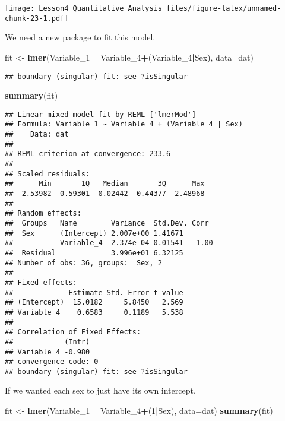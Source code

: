 \documentclass[
]{article}
\newenvironment{Shaded}{\begin{snugshade}}{\end{snugshade}}
\newcommand{\DataTypeTok}[1]{\textcolor[rgb]{0.13,0.29,0.53}{#1}}
\newcommand{\DecValTok}[1]{\textcolor[rgb]{0.00,0.00,0.81}{#1}}
\newcommand{\KeywordTok}[1]{\textcolor[rgb]{0.13,0.29,0.53}{\textbf{#1}}}
\newcommand{\NormalTok}[1]{#1}
\newcommand{\OperatorTok}[1]{\textcolor[rgb]{0.81,0.36,0.00}{\textbf{#1}}}
\newcommand{\StringTok}[1]{\textcolor[rgb]{0.31,0.60,0.02}{#1}}
\begin{document}
\texttt{[image: Lesson4\_Quantitative\_Analysis\_files/figure-latex/unnamed-chunk-23-1.pdf]}

We need a new package to fit this model.

\begin{Shaded}
\begin{Highlighting}[]
\NormalTok{fit <-}\StringTok{ }\KeywordTok{lmer}\NormalTok{(Variable_}\DecValTok{1} \OperatorTok{~}\StringTok{ }\NormalTok{Variable_}\DecValTok{4}\OperatorTok{+}\NormalTok{(Variable_}\DecValTok{4}\OperatorTok{|}\NormalTok{Sex), }\DataTypeTok{data=}\NormalTok{dat)}
\end{Highlighting}
\end{Shaded}

\begin{verbatim}
## boundary (singular) fit: see ?isSingular
\end{verbatim}

\begin{Shaded}
\begin{Highlighting}[]
\KeywordTok{summary}\NormalTok{(fit)}
\end{Highlighting}
\end{Shaded}

\begin{verbatim}
## Linear mixed model fit by REML ['lmerMod']
## Formula: Variable_1 ~ Variable_4 + (Variable_4 | Sex)
##    Data: dat
## 
## REML criterion at convergence: 233.6
## 
## Scaled residuals: 
##      Min       1Q   Median       3Q      Max 
## -2.53982 -0.59301  0.02442  0.44377  2.48968 
## 
## Random effects:
##  Groups   Name        Variance  Std.Dev. Corr 
##  Sex      (Intercept) 2.007e+00 1.41671       
##           Variable_4  2.374e-04 0.01541  -1.00
##  Residual             3.996e+01 6.32125       
## Number of obs: 36, groups:  Sex, 2
## 
## Fixed effects:
##             Estimate Std. Error t value
## (Intercept)  15.0182     5.8450   2.569
## Variable_4    0.6583     0.1189   5.538
## 
## Correlation of Fixed Effects:
##            (Intr)
## Variable_4 -0.980
## convergence code: 0
## boundary (singular) fit: see ?isSingular
\end{verbatim}

If we wanted each sex to just have its own intercept.

\begin{Shaded}
\begin{Highlighting}[]
\NormalTok{fit <-}\StringTok{ }\KeywordTok{lmer}\NormalTok{(Variable_}\DecValTok{1} \OperatorTok{~}\StringTok{ }\NormalTok{Variable_}\DecValTok{4}\OperatorTok{+}\NormalTok{(}\DecValTok{1}\OperatorTok{|}\NormalTok{Sex), }\DataTypeTok{data=}\NormalTok{dat)}
\KeywordTok{summary}\NormalTok{(fit)}
\end{Highlighting}
\end{Shaded}
\end{document}
